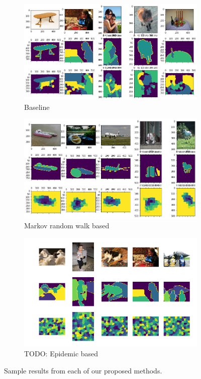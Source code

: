 \documentclass[twocolumn]{article}
\newcommand{\todo}[1]{}
\renewcommand{\todo}[1]{{\color{red} TODO: {#1}}}
\newcommand{\figlab}[1]{\label{fig:#1}}
\begin{document}
\begin{figure}[t!]
\centering

  \begin{subfigure}{\linewidth}
    \includegraphics[width=\linewidth]{figs/baseline_best.png}
    \caption{Baseline}
  \end{subfigure}

  \begin{subfigure}{\linewidth}
    \includegraphics[width=\linewidth]{figs/markov_best.png}
    \caption{Markov random walk based}
  \end{subfigure}

  \begin{subfigure}{\linewidth}
    \includegraphics[width=\linewidth]{figs/epidemic_best.png}
    \caption{\todo{Epidemic based}}
  \end{subfigure}

\caption{Sample results from each of our proposed methods.}
\figlab{sample_results}
\end{figure}
\end{document}
